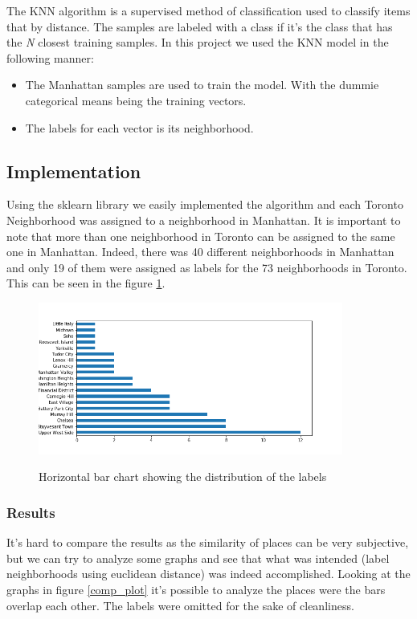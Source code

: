 \documentclass{article}
\begin{document}
The KNN algorithm is a supervised method of classification used to classify items that by distance. The samples are labeled with a class if it's the class that has the \emph{N} closest training samples. In this project we used the KNN model in the following manner:
\begin{itemize}
	\item The Manhattan samples are used to train the model. With the dummie categorical means being the training vectors.
	\item The labels for each vector is its neighborhood.
\end{itemize}

\subsection{Implementation}
Using the sklearn library we easily implemented the algorithm and each Toronto Neighborhood was assigned to a neighborhood in Manhattan. It is important to note that more than one neighborhood in Toronto can be assigned to the same one in Manhattan. Indeed, there was 40 different neighborhoods in Manhattan and only 19 of them were assigned as labels for the 73 neighborhoods in Toronto. This can be seen in the figure \ref{barh}.

\begin{figure}[h!]
	\includegraphics[width=10cm]{barh.png}
	\label{barh}
	\caption{Horizontal bar chart showing the distribution of the labels}
\end{figure}

\subsubsection{Results}
It's hard to compare the results as the similarity of places can be very subjective, but we can try to analyze some graphs and see that what was intended (label neighborhoods using euclidean distance) was indeed accomplished. Looking at the graphs in figure \ref{comp_plot} it's possible to analyze the places were the bars overlap each other. The labels were omitted for the sake of cleanliness. 
\end{document}
